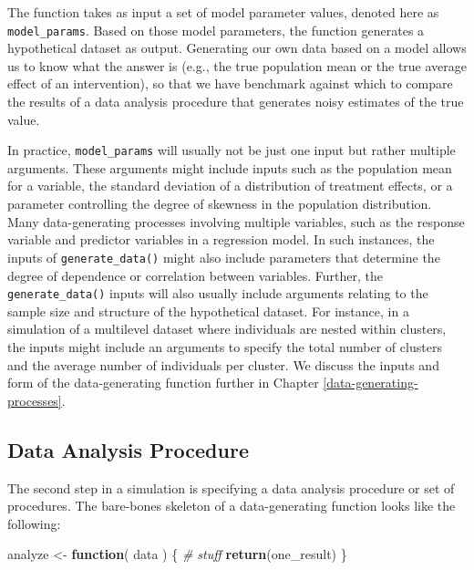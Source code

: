 \documentclass[
]{book}
\newenvironment{Shaded}{\begin{snugshade}}{\end{snugshade}}
\newcommand{\CommentTok}[1]{\textcolor[rgb]{0.56,0.35,0.01}{\textit{#1}}}
\newcommand{\ControlFlowTok}[1]{\textcolor[rgb]{0.13,0.29,0.53}{\textbf{#1}}}
\newcommand{\FunctionTok}[1]{\textcolor[rgb]{0.13,0.29,0.53}{\textbf{#1}}}
\newcommand{\NormalTok}[1]{#1}
\newcommand{\OtherTok}[1]{\textcolor[rgb]{0.56,0.35,0.01}{#1}}
\begin{document}
The function takes as input a set of model parameter values, denoted here as \texttt{model\_params}.
Based on those model parameters, the function generates a hypothetical dataset as output.
Generating our own data based on a model allows us to know what the answer is (e.g., the true population mean or the true average effect of an intervention), so that we have benchmark against which to compare the results of a data analysis procedure that generates noisy estimates of the true value.

In practice, \texttt{model\_params} will usually not be just one input but rather multiple arguments.
These arguments might include inputs such as the population mean for a variable, the standard deviation of a distribution of treatment effects, or a parameter controlling the degree of skewness in the population distribution.
Many data-generating processes involving multiple variables, such as the response variable and predictor variables in a regression model.
In such instances, the inputs of \texttt{generate\_data()} might also include parameters that determine the degree of dependence or correlation between variables.
Further, the \texttt{generate\_data()} inputs will also usually include arguments relating to the sample size and structure of the hypothetical dataset.
For instance, in a simulation of a multilevel dataset where individuals are nested within clusters, the inputs might include an arguments to specify the total number of clusters and the average number of individuals per cluster.
We discuss the inputs and form of the data-generating function further in Chapter \ref{data-generating-processes}.

\subsection{Data Analysis Procedure}\label{data-analysis-procedure}

The second step in a simulation is specifying a data analysis procedure or set of procedures.
The bare-bones skeleton of a data-generating function looks like the following:

\begin{Shaded}
\begin{Highlighting}[]
\NormalTok{analyze }\OtherTok{\textless{}{-}} \ControlFlowTok{function}\NormalTok{( data ) \{}
  \CommentTok{\# stuff}
  \FunctionTok{return}\NormalTok{(one\_result)}
\NormalTok{\}}
\end{Highlighting}
\end{Shaded}
\end{document}
